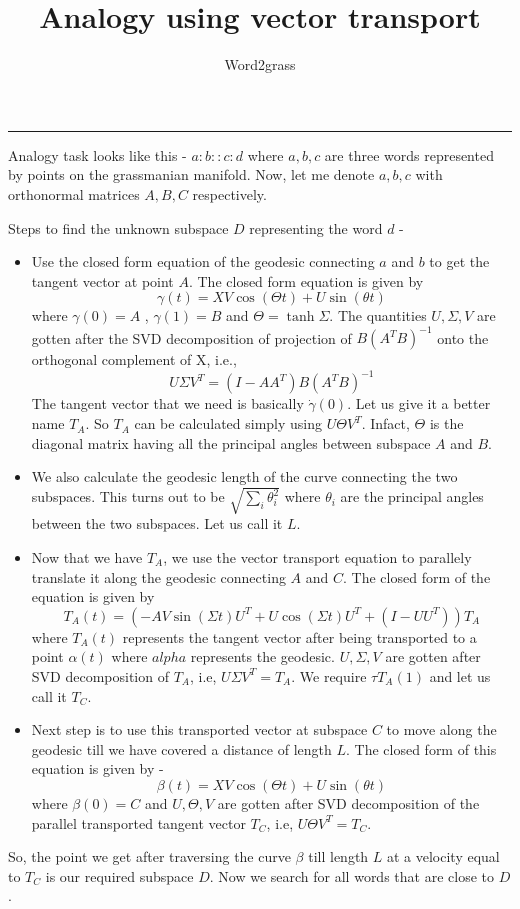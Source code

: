 \documentclass[a4paper,11pt]{article}
\title{Analogy using vector transport}
\author{Word2grass}
\begin{document}
\maketitle
\begin{center}
\rule{\textwidth}{1pt}
\end{center}

\noindent 
Analogy task looks like this - $a:b :: c:d$
where $a,b,c$ are three words represented by points on the grassmanian manifold. 
Now, let me denote $a,b,c$ with orthonormal matrices $A,B,C$ respectively.

\noindent Steps to find the unknown subspace $D$ representing the word $d$ - 

\begin{itemize}
  \item Use the closed form equation of the geodesic connecting $a$ and $b$ to get the tangent vector at point $A$. The closed form equation is given by 
  \[\gamma(t) = XV\cos(\Theta t) + U\sin(\theta t)\] where $\gamma(0)=A$ , $\gamma(1)=B$ and $\Theta = \tanh{\Sigma}$. The quantities $U,\Sigma, V$ are gotten after the SVD decomposition of projection of $B(A^TB)^{-1}$ onto the orthogonal complement of X, i.e.,
  \[U\Sigma V^T = (I - AA^T)B(A^TB)^{-1}\]
  The tangent vector that we need is basically $\dot \gamma(0)$. Let us give it a better name $T_A$. So $T_A$ can be calculated simply using $U \Theta V^T$. Infact, $\Theta$ is the diagonal matrix having all the principal angles between subspace $A$ and $B$. 
  \item We also calculate the geodesic length of the curve connecting the two subspaces. This turns out to be $\sqrt{\sum_i \theta_i^{2}}$ where $\theta_i$ are the principal angles between the two subspaces. Let us call it $L$.
  \item Now that we have $T_A$, we use the vector transport equation to parallely translate it along the geodesic connecting $A$ and $C$. The closed form of the equation is given by 
  \[T_A(t) = (-AV \sin(\Sigma t)U^T + U\cos (\Sigma t)U^T + (I - UU^T))T_A \] where $T_A(t)$ represents the tangent vector after being transported to a point $\alpha(t)$ where $alpha$ represents the geodesic. $U,\Sigma, V$ are gotten after SVD decomposition of $T_A$, i.e, $U \Sigma V^T = T_A$. We require $\tau T_A(1)$ and let us call it $T_C$. 
  \item Next step is to use this transported vector at subspace $C$ to move along the geodesic till we have covered a distance of length $L$. The closed form of this equation is given by - 
  \[\beta(t) = XV\cos(\Theta t) + U\sin(\theta t) \] where $\beta(0) = C$ and $U,\Theta, V$ are gotten after SVD decomposition of the parallel transported tangent vector $T_C$, i.e, $U\Theta V^T = T_{C}$.
\end{itemize}

\noindent So, the point we get after traversing the curve $\beta$ till length $L$ at a velocity equal to $T_{C}$ is our required subspace $D$. Now we search for all words that are close to $D$.
\end{document}
